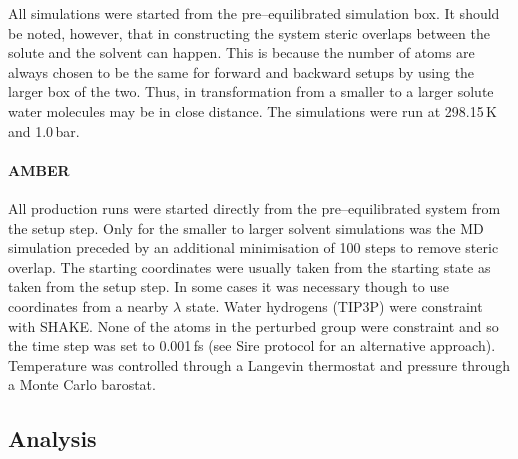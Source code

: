 \documentclass[journal=jctcce,manuscript=article]{achemso}
\begin{document}
All simulations were started from the pre--equilibrated simulation
box.  It should be noted, however, that in constructing the system
steric overlaps between the solute and the solvent can happen.  This
is because the number of atoms are always chosen to be the same for
forward and backward setups by using the larger box of the two.  Thus,
in transformation from a smaller to a larger solute water molecules
may be in close distance.  The simulations were run at 298.15\,K and
1.0\,bar.

\paragraph{AMBER} All production runs were started directly from the
pre--equilibrated system from the setup step.  Only for the smaller to
larger solvent simulations was the MD simulation preceded by an
additional minimisation of 100 steps to remove steric overlap.  The
starting coordinates were usually taken from the starting state as
taken from the setup step.  In some cases it was necessary though to
use coordinates from a nearby $\lambda$ state.  Water hydrogens
(TIP3P) were constraint with SHAKE.  None of the atoms in the
perturbed group were constraint and so the time step was set to
0.001\,fs (see Sire protocol for an alternative approach).
Temperature was controlled through a Langevin thermostat and pressure
through a Monte Carlo barostat.


\subsection{Analysis}
\label{sec:analysis}
\end{document}
